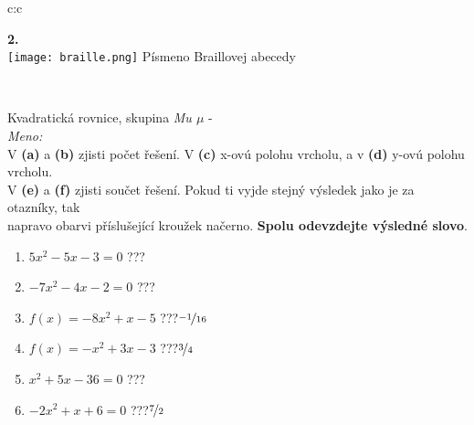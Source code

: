 \documentclass[10pt]{report}
\begin{document}
\begin{tabular}{c:c}
\begin{minipage}[c][99mm][t]{0.49\linewidth}
\begin{center}
\begin{minipage}{0.20\linewidth}
\begin{center}
{\Huge\bfseries 2.} \\[2mm]
\texttt{[image: braille.png]}
{\small Písmeno Braillovej abecedy}
\end{center}
\end{minipage}
\end{center}
\end{minipage}
\\ \hdashline
\begin{minipage}[c][99mm][t]{0.49\linewidth}
\begin{center}
\vspace{7mm}
{\huge Kvadratická rovnice, skupina \textit{Mu $\mu$} -}\\[4.5mm]
\textit{Meno:}\phantom{xxxxxxxxxxxxxxxxxxxxxxxxxxxxxxxxxxxxxxxxxxxxxxxxxxxxxxxxxxxxxxxxx}\\[3.5mm]
V \textbf{(a)} a \textbf{(b)} zjisti počet řešení. V \textbf{(c)} x-ovú polohu vrcholu, a v \textbf{(d)} y-ovú polohu vrcholu.\\V \textbf{(e)} a \textbf{(f)} zjisti součet řešení. Pokud ti vyjde stejný výsledek jako je za otazníky, tak\\napravo obarvi příslušející kroužek načerno. \textbf{Spolu odevzdejte výsledné slovo}.\\[3mm]
\begin{minipage}{0.77\linewidth}
\begin{center}
\begin{varwidth}{\textwidth}
\begin{enumerate}
\large
\item $5x^2-5x-3=0$\quad \dotfill\; ???\;\dotfill {}
\item $-7x^2-4x-2=0$\quad \dotfill\; ???\;\dotfill {}
\item $f(x)=-8x^2+x-5$\quad \dotfill\; ???\;\dotfill \quad $\nicefrac{-1}{16}$
\item $f(x)=-x^2+3x-3$\quad \dotfill\; ???\;\dotfill \quad $\nicefrac{3}{4}$
\item $x^2+5x-36=0$\quad \dotfill\; ???\;\dotfill {}
\item $-2x^2+x+6=0$\quad \dotfill\; ???\;\dotfill \quad $\nicefrac{7}{2}$
\end{enumerate}
\end{varwidth}
\end{center}
\end{minipage}
\begin{minipage}{0.20\linewidth}
\begin{center}

\end{center}
\end{minipage}
\end{center}
\end{minipage}
\end{tabular}
\end{document}
